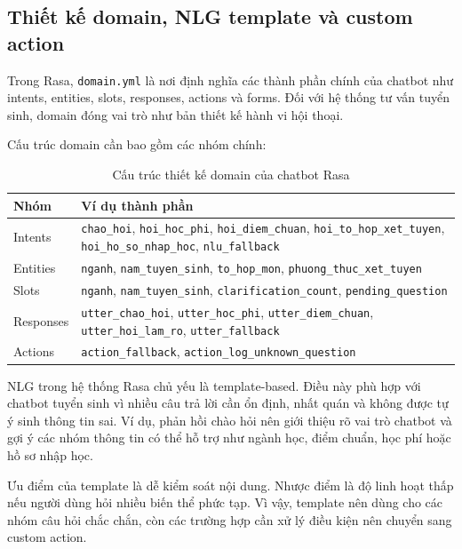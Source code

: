 \subsection{Thiết kế domain, NLG template và custom action}

Trong Rasa, \texttt{domain.yml} là nơi định nghĩa các thành phần chính của chatbot như intents, entities, slots, responses, actions và forms. Đối với hệ thống tư vấn tuyển sinh, domain đóng vai trò như bản thiết kế hành vi hội thoại.

Cấu trúc domain cần bao gồm các nhóm chính:

\begin{table}[H]
\centering
\begin{tabular}{|p{3.5cm}|p{9cm}|}
\hline
\textbf{Nhóm} & \textbf{Ví dụ thành phần} \\
\hline
Intents & \texttt{chao\_hoi}, \texttt{hoi\_hoc\_phi}, \texttt{hoi\_diem\_chuan}, \texttt{hoi\_to\_hop\_xet\_tuyen}, \texttt{hoi\_ho\_so\_nhap\_hoc}, \texttt{nlu\_fallback} \\
\hline
Entities & \texttt{nganh}, \texttt{nam\_tuyen\_sinh}, \texttt{to\_hop\_mon}, \texttt{phuong\_thuc\_xet\_tuyen} \\
\hline
Slots & \texttt{nganh}, \texttt{nam\_tuyen\_sinh}, \texttt{clarification\_count}, \texttt{pending\_question} \\
\hline
Responses & \texttt{utter\_chao\_hoi}, \texttt{utter\_hoc\_phi}, \texttt{utter\_diem\_chuan}, \texttt{utter\_hoi\_lam\_ro}, \texttt{utter\_fallback} \\
\hline
Actions & \texttt{action\_fallback}, \texttt{action\_log\_unknown\_question} \\
\hline
\end{tabular}
\caption{Cấu trúc thiết kế domain của chatbot Rasa}
\label{tab:rasa-domain-design}
\end{table}

NLG trong hệ thống Rasa chủ yếu là template-based. Điều này phù hợp với chatbot tuyển sinh vì nhiều câu trả lời cần ổn định, nhất quán và không được tự ý sinh thông tin sai. Ví dụ, phản hồi chào hỏi nên giới thiệu rõ vai trò chatbot và gợi ý các nhóm thông tin có thể hỗ trợ như ngành học, điểm chuẩn, học phí hoặc hồ sơ nhập học.

Ưu điểm của template là dễ kiểm soát nội dung. Nhược điểm là độ linh hoạt thấp nếu người dùng hỏi nhiều biến thể phức tạp. Vì vậy, template nên dùng cho các nhóm câu hỏi chắc chắn, còn các trường hợp cần xử lý điều kiện nên chuyển sang custom action.


